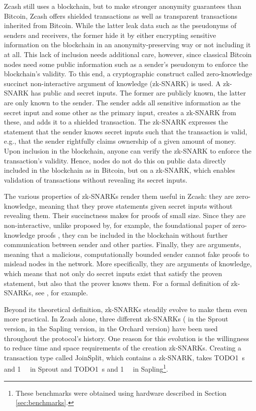 \documentclass{article}
\begin{document}
Zcash still uses a blockchain, but to make stronger anonymity guarantees than Bitcoin, Zcash offers shielded transactions as well as transparent transactions inherited from Bitcoin.
While the latter leak data such as the pseudonyms of senders and receivers, the former hide it by either encrypting sensitive information on the blockchain in an anonymity-preserving way or not including it at all.
This lack of inclusion needs additional care, however, since classical Bitcoin nodes need some public information such as a sender's pseudonym to enforce the blockchain's validity.
To this end, a cryptographic construct called zero-knowledge succinct non-interactive argument of knowledge (zk-SNARK) is used.
A zk-SNARK has public and secret inputs.
The former are publicly known, the latter are only known to the sender.
The sender adds all sensitive information as the secret input and some other as the primary input, creates a zk-SNARK from these, and adds it to a shielded transaction.
The zk-SNARK expresses the statement that the sender knows secret inputs such that the transaction is valid, e.g., that the sender rightfully claims ownership of a given amount of money.
Upon inclusion in the blockchain, anyone can verify the zk-SNARK to enforce the transaction's validity.
Hence, nodes do not do this on public data directly included in the blockchain as in Bitcoin, but on a zk-SNARK, which enables validation of transactions without revealing its secret inputs.

The various properties of zk-SNARKs render them useful in Zcash: they are zero-knowledge, meaning that they prove statements given secret inputs without revealing them.
Their succinctness makes for proofs of small size.
Since they are non-interactive, unlike proposed by, for example, the foundational paper of zero-knowledge proofs \cite{goldwasser:zk}, they can be included in the blockchain without further communication between sender and other parties.
Finally, they are arguments, meaning that a malicious, computationally bounded sender cannot fake proofs to mislead nodes in the network.
More specifically, they are arguments of knowledge, which means that not only do secret inputs exist that satisfy the proven statement, but also that the prover knows them.
For a formal definition of zk-SNARKs, see \cite{groth:zksnark}, for example.

Beyond its theoretical definition, zk-SNARKs steadily evolve to make them even more practical.
In Zcash alone, three different zk-SNARKs (\cite{bensasson:zksnark} in the Sprout version, \cite{groth:zksnark} in the Sapling version, \cite{zcash:halo2} in the Orchard version) have been used throughout the protocol's history.
One reason for this evolution is the willingness to reduce time and space requirements of the creation zk-SNARKs.
Creating a transaction type called JoinSplit, which contains a zk-SNARK, takes TODO\SI{1}{\second} and \SI{1}{\gibi\byte} in Sprout and TODO\SI{1}{\second} and \SI{1}{\gibi\byte} in Sapling\footnote{These benchmarks were obtained using hardware described in Section \ref{sec:benchmarks}.}.
\end{document}
